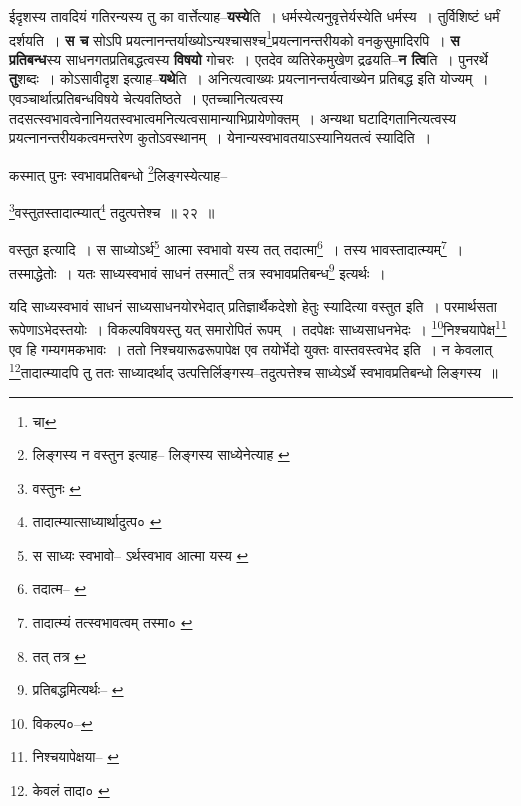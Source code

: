 \documentclass[article,12pt,a4paper]{memoir}
\begin{document}
	  \pstart ईदृशस्य तावदियं गतिरन्यस्य तु का वार्त्तेत्याह--\textbf{यस्ये}ति । धर्मस्येत्यनुवृत्तेर्यस्येति धर्मस्य । तुर्विशिष्टं धर्मं दर्शयति । \textbf{स च} सोऽपि प्रयत्नानन्तर्याख्योऽन्यश्चासश्च\footnote{चा}प्रयत्नानन्तरीयको वनकुसुमादिरपि । \textbf{स प्रतिबन्ध}स्य साधनगतप्रतिबद्धत्वस्य \textbf{विषयो} गोचरः । एतदेव व्यतिरेकमुखेण द्रढयति--\textbf{न त्वि}ति । पुनरर्थे \textbf{तु}शब्दः । कोऽसावीदृश इत्याह--\textbf{यथे}ति । अनित्यत्वाख्यः प्रयत्नानन्तर्यत्वाख्येन प्रतिबद्ध इति योज्यम् । एवञ्चार्थात्प्रतिबन्धविषये चेत्यव\leavevmode{}तिष्ठते । एतच्चानित्यत्वस्य तदसत्स्वभावत्वेनानियतस्वभात्वमनित्यत्वसामान्याभिप्रायेणोक्तम् । अन्यथा घटादिगतानित्यत्वस्य प्रयत्नानन्तरीयकत्वमन्तरेण कुतोऽवस्थानम् । येनान्यस्वभावतयाऽस्यानियतत्वं स्यादिति ।
	\pend
      \leavevmode{}
	  \bigskip
	  \begingroup
	

	  \pstart कस्मात् पुनः स्वभावप्रतिबन्धो \footnote{लिङ्गस्य न वस्तुन इत्याह--\cite{dp-msB} \cite{dp-msD} \cite{dp-edH} लिङ्गस्य साध्येनेत्याह \cite{dp-edN}}लिङ्गस्येत्याह--
	\pend
       
	  \bigskip
	  \begingroup
	

	  \pstart \footnote{वस्तुनः \cite{dp-edP}}वस्तुतस्तादात्म्यात्\footnote{तादात्म्यात्साध्यार्थादुत्प० \cite{dp-msB} \cite{dp-edP} \cite{dp-edH} \cite{dp-edE} \cite{dp-edN}} तदुत्पत्तेश्च ॥ २२ ॥
	\pend
      
	  \endgroup
	 

	  \pstart वस्तुत इत्यादि । स साध्योऽर्थ\footnote{स साध्यः स्वभावो--\cite{dp-msB} ऽर्थस्वभाव आत्मा यस्य \cite{dp-msD}} आत्मा स्वभावो यस्य तत् तदात्मा\footnote{तदात्म--\cite{dp-msC} \cite{dp-msD}} । तस्य भावस्तादात्म्यम्\footnote{तादात्म्यं तत्स्वभावत्वम् तस्मा० \cite{dp-msB}} । तस्माद्धेतोः । यतः साध्यस्वभावं साधनं तस्मात्\footnote{तत् तत्र \cite{dp-msB} \cite{dp-edN} \cite{dp-edH}} तत्र स्वभावप्रतिबन्ध\footnote{प्रतिबद्धमित्यर्थः--\cite{dp-msA} \cite{dp-msB} \cite{dp-edP} \cite{dp-edH} \cite{dp-edE} \cite{dp-edN}} इत्यर्थः ।
	\pend
       

	  \pstart यदि साध्यस्वभावं साधनं साध्यसाधनयोरभेदात् प्रतिज्ञार्थैकदेशो हेतुः स्यादित्या वस्तुत इति । परमार्थसता रूपेणाऽभेदस्तयोः । विकल्पविषयस्तु यत् समारोपितं रूपम् । तदपेक्षः साध्यसाधनभेदः । \footnote{विकल्प०--\cite{dp-msD-n}}निश्चयापेक्ष\footnote{निश्चयापेक्षया--\cite{dp-msB} \cite{dp-msC} \cite{dp-msD}} एव हि गम्यगमकभावः । ततो निश्चयारूढरूपापेक्ष एव तयोर्भेदो युक्तः वास्तवस्त्वभेद इति । न केवलात् \footnote{केवलं तादा० \cite{dp-msA} \cite{dp-msB} \cite{dp-msD} \cite{dp-edP} \cite{dp-edH} \cite{dp-edE} \cite{dp-edN}}तादात्म्यादपि तु ततः साध्यादर्थाद् उत्पत्तिर्लिङ्गस्य--तदुत्पत्तेश्च साध्येऽर्थे स्वभावप्रतिबन्धो लिङ्गस्य ॥
	\pend
      
\end{document}
